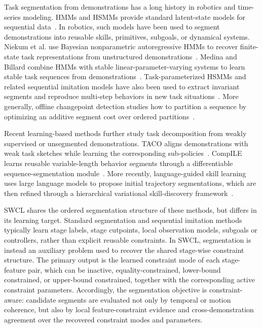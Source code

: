 \documentclass[lettersize,journal]{IEEEtran}
\begin{document}
Task segmentation from demonstrations has a long history in robotics and time-series modeling. HMMs and HSMMs provide standard latent-state models for sequential data~\cite{rabiner1989hmm,johnson2013hsmm}. In robotics, such models have been used to segment demonstrations into reusable skills, primitives, subgoals, or dynamical systems. Niekum et al. use Bayesian nonparametric autoregressive HMMs to recover finite-state task representations from unstructured demonstrations~\cite{niekum2015grounded}. Medina and Billard combine HMMs with stable linear-parameter-varying systems to learn stable task sequences from demonstrations~\cite{medina2017stable}. Task-parameterized HSMMs and related sequential imitation models have also been used to extract invariant segments and reproduce multi-step behaviors in new task situations~\cite{tanwani2016semi,tanwani2021sequential}. More generally, offline changepoint detection studies how to partition a sequence by optimizing an additive segment cost over ordered partitions~\cite{truong2020selective,aminikhanghahi2017survey}.

Recent learning-based methods further study task decomposition from weakly supervised or unsegmented demonstrations. TACO aligns demonstrations with weak task sketches while learning the corresponding sub-policies~\cite{shiarlis2018taco}. CompILE learns reusable variable-length behavior segments through a differentiable sequence-segmentation module~\cite{kipf2019compile}. More recently, language-guided skill learning uses large language models to propose initial trajectory segmentations, which are then refined through a hierarchical variational skill-discovery framework~\cite{fu2024language}.

SWCL shares the ordered segmentation structure of these methods, but differs in its learning target. Standard segmentation and sequential imitation methods typically learn stage labels, stage cutpoints, local observation models, subgoals or controllers, rather than explicit reusable constraints. In SWCL, segmentation is instead an auxiliary problem used to recover the shared stage-wise constraint structure. The primary output is the learned constraint mode of each stage-feature pair, which can be inactive, equality-constrained, lower-bound constrained, or upper-bound constrained, together with the corresponding active constraint parameters. Accordingly, the segmentation objective is constraint-aware: candidate segments are evaluated not only by temporal or motion coherence, but also by local feature-constraint evidence and cross-demonstration agreement over the recovered constraint modes and parameters.
\end{document}
